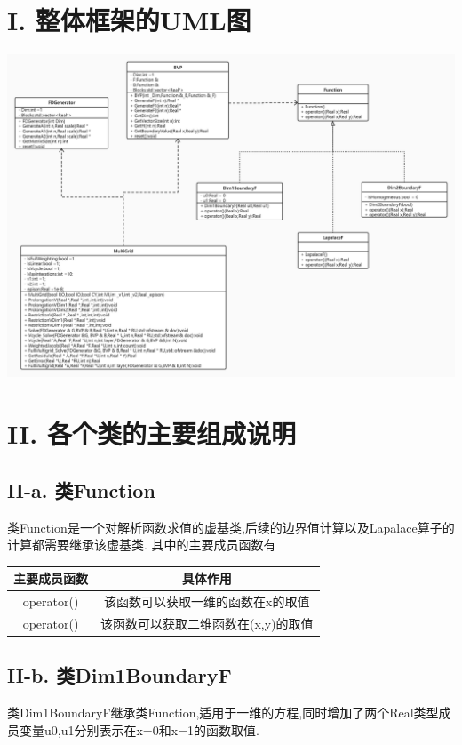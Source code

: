\documentclass[twoside,a4paper]{article}
\begin{document}
\pagestyle{fancy}
\fancyhead{}

\section*{I. 整体框架的UML图}
\begin{center}
    \includegraphics[scale=0.23]{../png/uml.png}
\end{center}

\section*{II. 各个类的主要组成说明}
\subsection*{II-a. 类Function}
类Function是一个对解析函数求值的虚基类,后续的边界值计算以及Lapalace算子的计算都需要继承该虚基类.
其中的主要成员函数有
\begin{center}
    \begin{tabular}{c|c}
        主要成员函数 & 具体作用                            \\
        \hline
        operator()   & 该函数可以获取一维的函数在x的取值   \\
        operator()   & 该函数可以获取二维函数在(x,y)的取值 \\
    \end{tabular}
\end{center}

\subsection*{II-b. 类Dim1BoundaryF}
类Dim1BoundaryF继承类Function,适用于一维的方程,同时增加了两个Real类型成员变量u0,u1分别表示在x=0和x=1的函数取值.
\end{document}
